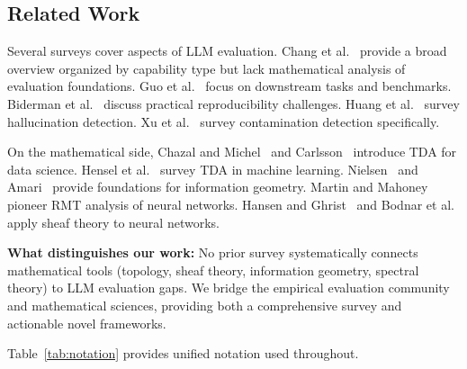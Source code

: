 \documentclass[11pt]{article}
\begin{document}
\subsection{Related Work}

Several surveys cover aspects of LLM evaluation. Chang et al.~\cite{chang2024survey} provide a broad overview organized by capability type but lack mathematical analysis of evaluation foundations. Guo et al.~\cite{guo2023evaluating} focus on downstream tasks and benchmarks. Biderman et al.~\cite{biderman2024lessons} discuss practical reproducibility challenges. Huang et al.~\cite{huang2023hallucination} survey hallucination detection. Xu et al.~\cite{xu2024contamination} survey contamination detection specifically.

On the mathematical side, Chazal and Michel~\cite{chazal2021introduction} and Carlsson~\cite{carlsson2009topology} introduce TDA for data science. Hensel et al.~\cite{hensel2021survey} survey TDA in machine learning. Nielsen~\cite{nielsen2020elementary} and Amari~\cite{amari2016information} provide foundations for information geometry. Martin and Mahoney~\cite{martin2018implicit} pioneer RMT analysis of neural networks. Hansen and Ghrist~\cite{hansen2019sheaf} and Bodnar et al.~\cite{bodnar2022neural} apply sheaf theory to neural networks.

\textbf{What distinguishes our work:} No prior survey systematically connects mathematical tools (topology, sheaf theory, information geometry, spectral theory) to LLM evaluation gaps. We bridge the empirical evaluation community and mathematical sciences, providing both a comprehensive survey and actionable novel frameworks.

Table~\ref{tab:notation} provides unified notation used throughout.
\end{document}
